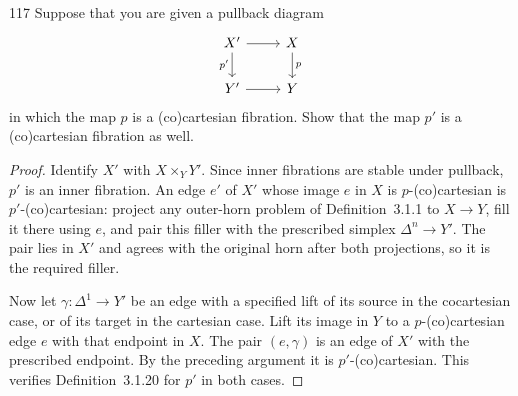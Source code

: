 \begin{exercise}{117}
Suppose that you are given a pullback diagram
\[
\begin{tikzcd}
 X' \arrow[r] \arrow[d,"p'"'] & X \arrow[d,"p"] \\
 Y' \arrow[r] & Y
\end{tikzcd}
\]
in which the map $p$ is a (co)cartesian fibration. Show that the map $p'$ is a (co)cartesian
fibration as well.

\begin{proof}
Identify $X'$ with $X\times_Y Y'$.
Since inner fibrations are stable under pullback, $p'$ is an inner fibration.
An edge $e'$ of $X'$ whose image $e$ in $X$ is $p$-(co)cartesian
is $p'$-(co)cartesian: project any outer-horn problem of
Definition~3.1.1 to $X\to Y$, fill it there using $e$, and pair this
filler with the prescribed simplex $\Delta^n\to Y'$.
The pair lies in $X'$ and agrees with the original horn after both projections,
so it is the required filler.

Now let $\gamma\colon\Delta^1\to Y'$ be an edge with a specified lift
of its source in the cocartesian case, or of its target in the cartesian case.
Lift its image in $Y$ to a $p$-(co)cartesian edge $e$ with that endpoint in $X$.
The pair $(e,\gamma)$ is an edge of $X'$ with the prescribed endpoint.
By the preceding argument it is $p'$-(co)cartesian.
This verifies Definition~3.1.20 for $p'$ in both cases.
\end{proof}
\end{exercise}
